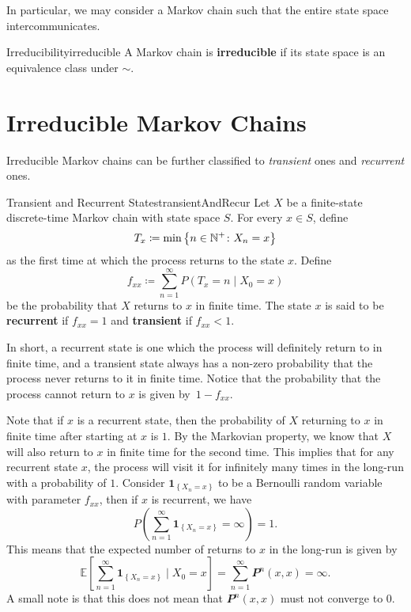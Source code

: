 \documentclass[math, code]{amznotes}
\theoremstyle{remark}
\begin{document}
In particular, we may consider a Markov chain such that the entire state space intercommunicates.
\begin{dfnbox}{Irreducibility}{irreducible}
    A Markov chain is {\color{red} \textbf{irreducible}} if its state space is an equivalence class under $\sim$.
\end{dfnbox}
\section{Irreducible Markov Chains}
Irreducible Markov chains can be further classified to \textit{transient} ones and \textit{recurrent} ones.
\begin{dfnbox}{Transient and Recurrent States}{transientAndRecur}
    Let $X$ be a finite-state discrete-time Markov chain with state space $S$. For every $x \in S$, define 
    \begin{equation*}
        T_x \coloneqq \min\left\{n \in \mathbb{N}^+ \colon X_n = x\right\}
    \end{equation*}
    as the first time at which the process returns to the state $x$. Define 
    \begin{equation*}
        f_{xx} \coloneqq \sum_{n = 1}^{\infty}P\left(T_x = n \mid X_0 = x\right)
    \end{equation*}
    be the probability that $X$ returns to $x$ in finite time. The state $x$ is said to be {\color{red} \textbf{recurrent}} if $f_{xx} = 1$ and {\color{red} \textbf{transient}} if $f_{xx} < 1$.
\end{dfnbox}
In short, a recurrent state is one which the process will definitely return to in finite time, and a transient state always has a non-zero probability that the process never returns to it in finite time. Notice that the probability that the process cannot return to $x$ is given by~$1 - f_{xx}$.

Note that if $x$ is a recurrent state, then the probability of $X$ returning to $x$ in finite time after starting at $x$ is $1$. By the Markovian property, we know that $X$ will also return to $x$ in finite time for the second time. This implies that for any recurrent state $x$, the process will visit it for infinitely many times in the long-run with a probability of $1$. Consider $\mathbf{1}_{\left\{X_n = x\right\}}$ to be a Bernoulli random variable with parameter $f_{xx}$, then if $x$ is recurrent, we have 
\begin{equation*}
    P\left(\sum_{n = 1}^{\infty}\mathbf{1}_{\left\{X_n = x\right\}} = \infty\right) = 1.
\end{equation*}
This means that the expected number of returns to $x$ in the long-run is given by
\begin{equation*}
    \mathbb{E}\left[\sum_{n = 1}^{\infty}\mathbf{1}_{\left\{X_n = x\right\}} \mid X_0 = x\right] = \sum_{n = 1}^{\infty}\mathbfit{P}^n\left(x, x\right) = \infty.
\end{equation*}
A small note is that this does not mean that $\mathbfit{P}^n\left(x, x\right)$ must not converge to $0$.
\end{document}
